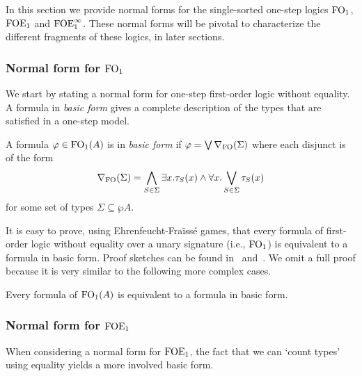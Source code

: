 

In this section we provide normal forms for the single-sorted one-step logics $\mathrm{FO}_1$, $\mathrm{FOE}_1$ and $\mathrm{FOE}^{\infty}_1$. These normal forms will be pivotal to characterize the different fragments of these logics, in later sections.

\subsubsection{Normal form for $\mathrm{FO}_1$}

We start by stating a normal form for one-step first-order logic without equality. A formula in \emph{basic form} gives a complete description of the types that are satisfied in a one-step model.

\index{$\dbnfofo{\Sigma}$}
\begin{definition}\label{def:bfofo}%
A formula $\varphi \in \mathrm{FO}_1(A)$ is in \emph{basic form} if $\varphi = \bigvee \nabla_{\mathrm{FO}}(\Sigma)$
where each disjunct is of the form
\[
\nabla_{\mathrm{FO}}(\Sigma) = \bigwedge_{S\in\Sigma} \exists x. \tau_S(x) \land \forall x. \bigvee_{S\in\Sigma} \tau_S(x)
\]
for some set of types $\Sigma\subseteq \wp A$.
\end{definition}

It is easy to prove, using Ehrenfeucht-Fra\"iss\'e games, that every formula of first-order logic without equality over a unary signature (i.e., $\mathrm{FO}_1$) is equivalent to a formula in basic form. Proof sketches can be found in~\cite[Lemma 16.23]{Graedel2002} and~\cite[Proposition 4.14]{Venema2014}. We omit a full proof because it is very similar to the following more complex cases.

\begin{fact}\label{fact:ofonormalform}
Every formula of $\mathrm{FO}_1(A)$ is equivalent to a formula in basic form.
\end{fact}

\subsubsection{Normal form for $\mathrm{FOE}_1$}

When considering a normal form for $\mathrm{FOE}_1$, the fact that we can `count types' using equality yields a more involved basic form.

